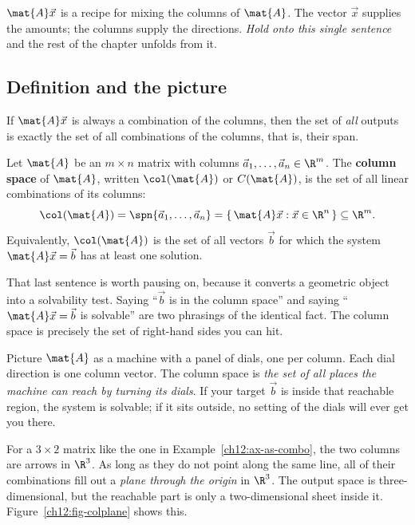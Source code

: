 \begin{focusbox}
$\mat{A}\vec{x}$ is a recipe for mixing the columns of $\mat{A}$. The vector
$\vec{x}$ supplies the amounts; the columns supply the directions. \emph{Hold
onto this single sentence} and the rest of the chapter unfolds from it.
\end{focusbox}

\subsection{Definition and the picture}

If $\mat{A}\vec{x}$ is always a combination of the columns, then the set of
\emph{all} outputs is exactly the set of all combinations of the columns, that
is, their span.

\begin{definition}\label{ch12:colspace-def}
Let $\mat{A}$ be an $m\times n$ matrix with columns
$\vec{a}_1,\dots,\vec{a}_n \in \R^m$. The \textbf{column space} of $\mat{A}$,
written $\col(\mat{A})$ or $C(\mat{A})$, is the set of all linear combinations
of its columns:
\[
  \col(\mat{A}) = \spn\{\vec{a}_1, \dots, \vec{a}_n\}
  = \{\,\mat{A}\vec{x} : \vec{x} \in \R^n\,\} \subseteq \R^m.
\]
Equivalently, $\col(\mat{A})$ is the set of all vectors $\vec{b}$ for which the
system $\mat{A}\vec{x} = \vec{b}$ has at least one solution.
\end{definition}

That last sentence is worth pausing on, because it converts a geometric object
into a solvability test. Saying ``$\vec{b}$ is in the column space'' and saying
``$\mat{A}\vec{x} = \vec{b}$ is solvable'' are two phrasings of the identical
fact. The column space is precisely the set of right-hand sides you can hit.

\begin{intuitionbox}
Picture $\mat{A}$ as a machine with a panel of dials, one per column. Each dial
direction is one column vector. The column space is \emph{the set of all places
the machine can reach by turning its dials}. If your target $\vec{b}$ is inside
that reachable region, the system is solvable; if it sits outside, no setting of
the dials will ever get you there.
\end{intuitionbox}

For a $3\times 2$ matrix like the one in Example~\ref{ch12:ax-as-combo}, the two
columns are arrows in $\R^3$. As long as they do not point along the same line,
all of their combinations fill out a \emph{plane through the origin} in $\R^3$.
The output space is three-dimensional, but the reachable part is only a
two-dimensional sheet inside it. Figure~\ref{ch12:fig-colplane} shows this.

